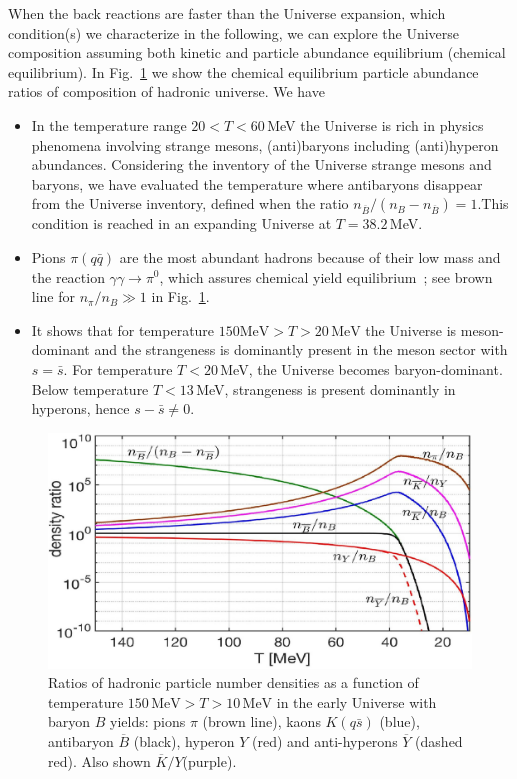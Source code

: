\documentclass[Universe,article,submit,moreauthors,pdftex]{Definitions/mdpi}
\begin{document}
When the back reactions are faster than the Universe expansion, which condition(s) we characterize in the following, we can explore the Universe composition assuming both kinetic and particle abundance equilibrium (chemical equilibrium). In Fig.~\ref{EquilibPartRatiosFig} we show the chemical equilibrium particle abundance ratios of composition of hadronic universe. We have
\begin{itemize}
\item
In the temperature range $20 <T <60$\,MeV the Universe is rich in physics phenomena involving strange mesons, (anti)baryons including (anti)hyperon abundances. Considering the inventory of the Universe strange mesons and baryons, we have evaluated the temperature where antibaryons disappear from the Universe inventory, defined when the ratio $n_{\overline B}/(n_B-n_{\overline B})=1$.This condition is reached in an expanding Universe at $T=38.2$\,MeV. 

\item
Pions $\pi(q\bar q)$ are the most abundant hadrons because of their low mass and the reaction $\gamma\gamma\rightarrow\pi^0$, which assures chemical yield equilibrium~\cite{Kuznetsova:2008jt}; see brown line for $n_\pi/n_B\gg1$ in Fig.~\ref{EquilibPartRatiosFig}.

\item
It shows that for temperature $150 \mathrm{MeV}>T>20\,\mathrm{MeV}$ the Universe is meson-dominant and the strangeness is dominantly present in the meson sector with $s=\bar s$. For temperature $T<20$\,MeV, the Universe becomes baryon-dominant. Below temperature $T<13$\,MeV, strangeness is present dominantly in hyperons, hence $s -\bar s\ne 0$.
\end{itemize}
\begin{figure}[bt]
\centering
\includegraphics[width=0.85\linewidth]{Meson_Baryon_density_ratio_C.jpg}
\caption{Ratios of hadronic particle number densities as a function of temperature $150\,\mathrm{MeV}> T>10\,\mathrm{MeV}$ in the early Universe with baryon $B$ yields: pions $\pi$ (brown line), kaons $K( q\bar s)$ (blue), antibaryon $\overline B$ (black), hyperon $Y$ (red) and anti-hyperons $\overline Y$ (dashed red). Also shown $\overline K/Y$(purple).}
\label{EquilibPartRatiosFig}
\end{figure}
\end{document}
